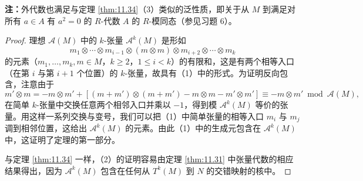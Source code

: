 \noindent\textbf{注：}外代数也满足与定理 \ref{thm:11.34}（3）类似的泛性质，即关于从 \(M\) 到满足对所有 \(a \in A\) 有 \(a^2 = 0\) 的 \(R\)-代数 \(A\) 的 \(R\)-模同态（参见习题 6）。

\begin{proof}
理想 \(\mathcal{A}(M)\) 中的 \(k\)-张量 \(\mathcal{A}^k(M)\) 是形如
\[
m_1 \otimes \cdots \otimes m_{i-1} \otimes (m \otimes m) \otimes m_{i+2} \otimes \cdots \otimes m_k
\]
的元素（\(m_1, \ldots, m_k, m \in M\)，\(k \geq 2\)，\(1 \leq i < k\)）的有限和，这是有两个相等入口（在第 \(i\) 与第 \(i+1\) 个位置）的 \(k\)-张量，故具有（1）中的形式。为证明反向包含，注意由于
\[
m' \otimes m = -m \otimes m'+[(m+m') \otimes (m+m')-m \otimes m-m' \otimes m'] \equiv -m \otimes m' \bmod \mathcal{A}(M),
\]
在简单 \(k\)-张量中交换任意两个相邻入口并乘以 \(-1\)，得到模 \(\mathcal{A}^k(M)\) 等价的张量。用这样一系列交换与变号，我们可以把（1）中简单张量的相等入口 \(m_i\) 与 \(m_j\) 调到相邻位置，这给出 \(\mathcal{A}^k(M)\) 的元素。由此（1）中的生成元包含在 \(\mathcal{A}^k(M)\) 中，这证明了定理的第一部分。

与定理 \ref{thm:11.34} 一样，（2）的证明容易由定理 \ref{thm:11.31} 中张量代数的相应结果得出，因为 \(\mathcal{A}^k(M)\) 包含在任何从 \(T^k(M)\) 到 \(N\) 的交错映射的核中。
\end{proof}

